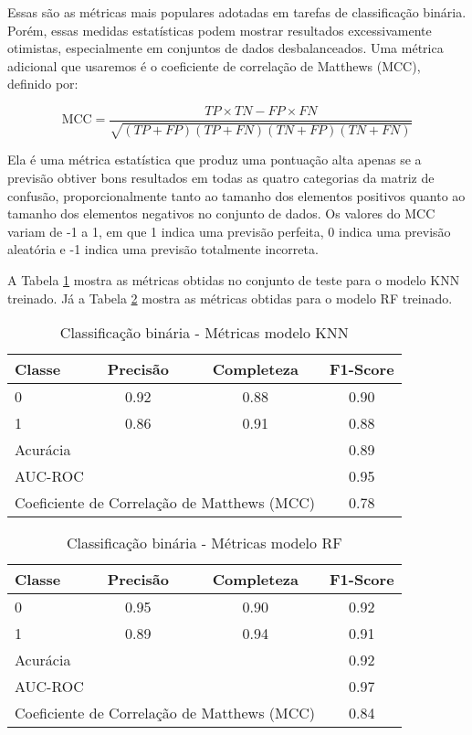 Essas são as métricas mais populares adotadas em tarefas de classificação binária. Porém, essas medidas estatísticas podem mostrar resultados excessivamente otimistas, especialmente em conjuntos de dados desbalanceados. Uma métrica adicional que usaremos é o coeficiente de correlação de Matthews (MCC), definido por:

\begin{equation}
    \text{MCC} = \frac{TP \times TN - FP \times FN}{\sqrt{(TP + FP)(TP + FN)(TN + FP)(TN + FN)}}
\end{equation}

Ela é uma métrica estatística que produz uma pontuação alta apenas se a previsão obtiver bons resultados em todas as quatro categorias da matriz de confusão, proporcionalmente tanto ao tamanho dos elementos positivos quanto ao tamanho dos elementos negativos no conjunto de dados. Os valores do MCC variam de -1 a 1, em que 1 indica uma previsão perfeita, 0 indica uma previsão aleatória e -1 indica uma previsão totalmente incorreta.

A Tabela \ref{metricas_modelo_knn} mostra as métricas obtidas no conjunto de teste para o modelo KNN treinado. Já a Tabela \ref{metricas_modelo_rf} mostra as métricas obtidas para o modelo RF treinado.

\begin{table}[!ht]
    \centering
    \caption{Classificação binária - Métricas modelo KNN}
    \begin{tabular}{lccc}
        \toprule
        Classe & Precisão & Completeza & F1-Score \\
        \midrule
        0 & 0.92 & 0.88 & 0.90 \\
        1 & 0.86 & 0.91 & 0.88 \\
        \midrule
        \multicolumn{3}{l}{Acurácia} & 0.89 \\
        \multicolumn{3}{l}{AUC-ROC} & 0.95 \\
        \multicolumn{3}{l}{Coeficiente de Correlação de Matthews (MCC)} & 0.78 \\
        \bottomrule
    \end{tabular}
    \label{metricas_modelo_knn}
\end{table}


\begin{table}[!ht]
    \centering
    \caption{Classificação binária - Métricas modelo RF}
    \begin{tabular}{lccc}
        \toprule
        Classe & Precisão & Completeza & F1-Score \\
        \midrule
        0 & 0.95 & 0.90 & 0.92 \\
        1 & 0.89 & 0.94 & 0.91 \\
        \midrule
        \multicolumn{3}{l}{Acurácia} & 0.92 \\
        \multicolumn{3}{l}{AUC-ROC} & 0.97 \\
        \multicolumn{3}{l}{Coeficiente de Correlação de Matthews (MCC)} & 0.84 \\
        \bottomrule
    \end{tabular}
    \label{metricas_modelo_rf}
\end{table}

